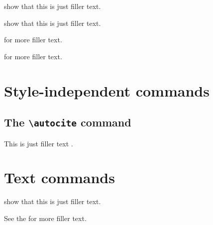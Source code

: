 \documentclass[a4paper]{article}
\newcommand{\cmd}[1]{\texttt{\textbackslash #1}}
\begin{document}

\textcite{companion} show that this is just filler text.

\textcite[59]{companion} show that this is just filler text.


\textcite[See][]{companion} for more filler text.

\textcite[See][59--63]{companion} for more filler text.

\section*{Style-independent commands}

\subsection*{The \cmd{autocite} command}


This is just filler text \autocite{companion}.

\section*{Text commands}


\citeauthor{companion} show that this is just filler text.


See the  for more filler text.
\end{document}
